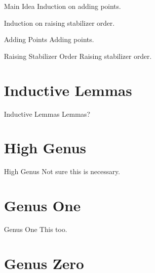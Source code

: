 \documentclass{beamer}
\theoremstyle{remark}
\begin{document}

\begin{frame}{Main Idea}
Induction on adding points.

Induction on raising stabilizer order.

\end{frame}


\begin{frame}{Adding Points}
Adding points.

\end{frame}


\begin{frame}{Raising Stabilizer Order}
Raising stabilizer order.

\end{frame}

\section{Inductive Lemmas} 

\begin{frame}{Inductive Lemmas}
Lemmas?

\end{frame}

\section{High Genus} 

\begin{frame}{High Genus}
Not sure this is necessary.

\end{frame}

\section{Genus One} 

\begin{frame}{Genus One}
This too.

\end{frame}

\section{Genus Zero} 
\end{document}
